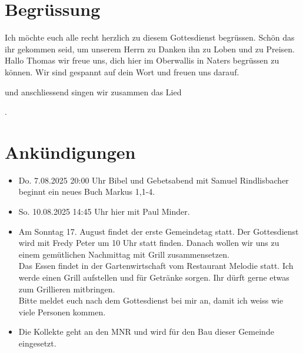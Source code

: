 \documentclass{../../inc/mybib}
\begin{document}
\section{Begrüssung}

Ich möchte euch alle recht herzlich zu diesem Gottesdienst begrüssen. Schön das ihr gekommen seid, um unserem Herrn zu Danken ihn zu Loben und zu Preisen.
Hallo Thomas wir freue uns, dich hier im Oberwallis in Naters begrüssen zu können. Wir sind gespannt auf dein Wort und freuen uns darauf.

\beten{} und anschliessend singen wir zusammen das Lied

{}.

\section{Ankündigungen}
\begin{itemize}
    \item {} Do. 7.08.2025 20:00 Uhr Bibel und Gebetsabend mit Samuel Rindlisbacher  beginnt ein neues Buch Markus 1,1-4.
    \item {} So. 10.08.2025 14:45 Uhr hier mit Paul Minder.
    \item {} Am Sonntag 17. August findet der erste Gemeindetag statt. Der Gottesdienst wird mit Fredy Peter um 10 Uhr statt finden. Danach wollen wir uns zu einem gemütlichen Nachmittag mit Grill zusammensetzen.\\    
    Das Essen findet in der Gartenwirtschaft vom Restaurant Melodie statt. Ich werde einen Grill aufstellen und für Getränke sorgen. Ihr dürft gerne etwas zum Grillieren mitbringen.\\
    Bitte meldet euch nach dem Gottesdienst bei mir an, damit ich weiss wie viele Personen kommen.\\
    \item {} Die Kollekte geht an den MNR und wird für den Bau dieser Gemeinde eingesetzt.
\end{itemize}
\end{document}

